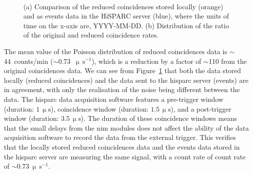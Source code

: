 \begin{figure}[ht!]
	\centering
	 \\
	
	\caption{(a) Comparison of the reduced coincidences stored locally (orange) and as events data in the HiSPARC server (blue), where the units of time on the x-axis are, YYYY-MM-DD. (b) Distribution of the ratio of the original and reduced coincidence rates.}
	\label{fig:reduced_coincidences}
\end{figure}

The mean value of the Poisson distribution of reduced coincidences data is $\sim$44~counts/min ($\sim$0.73~$\upmu \, \mathrm{s}^{-1}$), which is a reduction by a factor of $\sim$110 from the original coincidences data. We can see from Figure~\ref{fig:reduced_coincidences} that both the data stored locally (reduced coincidences) and the data sent to the \gls{hisparc} server (events) are in agreement, with only the realisation of the noise being different between the data. The \gls{hisparc} data acquisition software features a pre-trigger window (duration: $1 \, \upmu\mathrm{s}$), coincidence window (duration: $1.5 \, \upmu\mathrm{s}$), and a post-trigger window (duration: $3.5 \, \upmu\mathrm{s}$). The duration of these coincidence windows means that the small delays from the \gls{nim} modules does not affect the ability of the data acquisition software to record the data from the external trigger. This verifies that the locally stored reduced coincidences data and the events data stored in the \gls{hisparc} server are measuring the same signal, with a count rate of count rate of $\sim$$0.73~\upmu \, \mathrm{s}^{-1}$.


